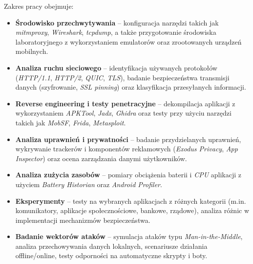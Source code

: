 Zakres pracy obejmuje:
\begin{itemize}
  \item \textbf{Środowisko przechwytywania} – konfiguracja narzędzi takich jak \textit{mitmproxy}, \textit{Wireshark}, \textit{tcpdump}, a także przygotowanie środowiska laboratoryjnego z wykorzystaniem emulatorów oraz zrootowanych urządzeń mobilnych.
  \item \textbf{Analiza ruchu sieciowego} – identyfikacja używanych protokołów (\emph{HTTP/1.1}, \emph{HTTP/2}, \emph{QUIC}, \emph{TLS}), badanie bezpieczeństwa transmisji danych (szyfrowanie, \emph{SSL pinning}) oraz klasyfikacja przesyłanych informacji.
  \item \textbf{Reverse engineering i testy penetracyjne} – dekompilacja aplikacji z wykorzystaniem \textit{APKTool}, \textit{Jadx}, \textit{Ghidra} oraz testy przy użyciu narzędzi takich jak \textit{MobSF}, \textit{Frida}, \textit{Metasploit}.
  \item \textbf{Analiza uprawnień i prywatności} – badanie przydzielanych uprawnień, wykrywanie trackerów i komponentów reklamowych (\textit{Exodus Privacy}, \textit{App Inspector}) oraz ocena zarządzania danymi użytkowników.
  \item \textbf{Analiza zużycia zasobów} – pomiary obciążenia baterii i \emph{CPU} aplikacji z użyciem \textit{Battery Historian} oraz \textit{Android Profiler}.
  \item \textbf{Eksperymenty} – testy na wybranych aplikacjach z różnych kategorii (m.in. komunikatory, aplikacje społecznościowe, bankowe, rządowe), analiza różnic w implementacji mechanizmów bezpieczeństwa.
  \item \textbf{Badanie wektorów ataków} – symulacja ataków typu \textit{Man-in-the-Middle}, analiza przechowywania danych lokalnych, scenariusze działania offline/online, testy odporności na automatyczne skrypty i boty.
\end{itemize}
